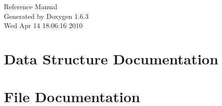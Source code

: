 \documentclass[a4paper]{article}
\begin{document}
\hypersetup{pageanchor=false}
\begin{titlepage}
\vspace*{7cm}
\begin{center}
{\Large Reference Manual}\\
\vspace*{1cm}
{\large Generated by Doxygen 1.6.3}\\
\vspace*{0.5cm}
{\small Wed Apr 14 18:06:16 2010}\\
\end{center}
\end{titlepage}
\tableofcontents
{}
\hypersetup{pageanchor=true}
\section{Data Structure Documentation}












\section{File Documentation}





\printindex
\end{document}
